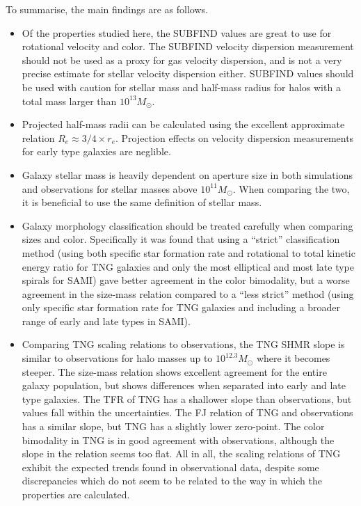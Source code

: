 To summarise, the main findings are as follows.
\begin{itemize}
	\item Of the properties studied here, the SUBFIND values are great to use for rotational velocity and color. The SUBFIND velocity dispersion measurement should not be used as a proxy for gas velocity dispersion, and is not a very precise estimate for stellar velocity dispersion either. SUBFIND values should be used with caution for stellar mass and half-mass radius for halos with a total mass larger than $10^{13} M_\odot$.
	\item Projected half-mass radii can be calculated using the excellent approximate relation $R_{e} \approx 3/4 \times r_{e}$. Projection effects on velocity dispersion measurements for early type galaxies are neglible.
	\item Galaxy stellar mass is heavily dependent on aperture size in both simulations and observations for stellar masses above $10^{11} M_\odot$. When comparing the two, it is beneficial to use the same definition of stellar mass.
	\item Galaxy morphology classification should be treated carefully when comparing sizes and color. Specifically it was found that using a ``strict'' classification method (using both specific star formation rate and rotational to total kinetic energy ratio for TNG galaxies and only the most elliptical and most late type spirals for SAMI) gave better agreement in the color bimodality, but a worse agreement in the size-mass relation compared to a ``less strict'' method (using only specific star formation rate for TNG galaxies and including a broader range of early and late types in SAMI).
	\item Comparing TNG scaling relations to observations, the TNG SHMR slope is similar to observations for halo masses up to $10^{12.3} M_\odot$ where it becomes steeper. The size-mass relation shows excellent agreement for the entire galaxy population, but shows differences when separated into early and late type galaxies. The TFR of TNG has a shallower slope than observations, but values fall within the uncertainties. The FJ relation of TNG and observations has a similar slope, but TNG has a slightly lower zero-point. The color bimodality in TNG is in good agreement with observations, although the slope in the relation seems too flat. All in all, the scaling relations of TNG exhibit the expected trends found in observational data, despite some discrepancies which do not seem to be related to the way in which the properties are calculated.
	

\end{itemize}

